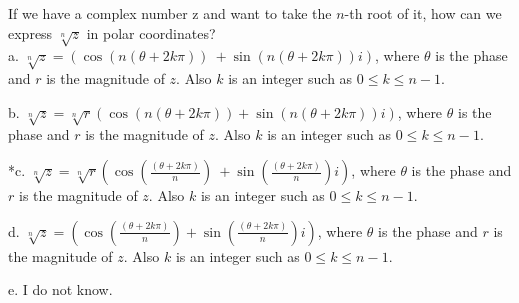 
If we have a complex number z and want to take the \(n\)-th root of
it, how can we express \(\sqrt[n]{z}\) in polar coordinates?\\

a.
\(\sqrt[n]{z} = (\cos(n(\theta + 2k\pi))\ +\sin(n(\theta + 2k\pi))i)\),
where \(\theta\) is the phase and \(r\) is the magnitude of \(z\). Also \(k\) is an
integer such as \(0 \leq k \leq n - 1\).

b.
\(\sqrt[n]{z} = \sqrt[n]{r}(\cos(n(\theta + 2k\pi)) + \sin(n(\theta + 2k\pi))i)\),
where \(\theta\) is the phase and \(r\) is the magnitude of \(z\). Also \(k\) is an
integer such as \(0 \leq k \leq n - 1\).

*c.
\(\sqrt[n]{z} = \sqrt[n]{r}(\cos(\frac{(\theta + 2k\pi)}{n})\  + \sin(\frac{(\theta + 2k\pi)}{n})i)\),
where \(\theta\) is the phase and \(r\) is the magnitude of \(z\). Also \(k\) is an
integer such as \(0 \leq k \leq n - 1\).

d.
\(\sqrt[n]{z} = (\cos(\frac{(\theta  + 2k\pi)}{n}) + \sin(\frac{(\theta + 2k\pi)}{n})i)\),
where \(\theta\) is the phase and \(r\) is the magnitude of \(z\). Also \(k\) is an
integer such as \(0 \leq k \leq n - 1\).

e. I do not know.\\

